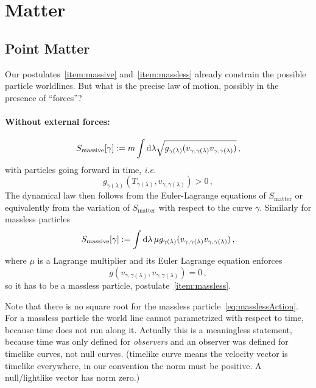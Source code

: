 \section{Matter}
\subsection{Point Matter}
Our postulates~\ref{item:massive} and~\ref{item:massless} already constrain the possible particle worldlines.
But what is the precise law of motion, possibly in the presence of ``forces''?

\paragraph{Without external forces:}
\begin{equation}
    S_\text{massive}[\gamma] := m\int\operatorname{d\!}\lambda\sqrt{g_{\gamma(\lambda)} ( v_{\gamma, \gamma(\lambda)} v_{\gamma, \gamma(\lambda)})}\,,
\end{equation}
with particles going forward in time, \textit{i.e.}
\begin{equation}
    g_{\gamma(\lambda)} \left( T_{\gamma(\lambda)}, v_{\gamma, \gamma(\lambda)} \right) > 0\,,
\end{equation}
The dynamical law then follows from the Euler-Lagrange equations of $S_\text{matter}$ or equivalently
from the variation of $S_\text{matter}$ with respect to the curve $\gamma$.
Similarly for massless particles
\begin{equation}
    S_\text{massive}[\gamma] := \int\operatorname{d\!}\lambda\, \mu g_{\gamma(\lambda)} ( v_{\gamma, \gamma(\lambda)} v_{\gamma, \gamma(\lambda)})\,,
    \label{eq:massiveAction}
\end{equation}
where $\mu$ is a Lagrange multiplier and its Euler Lagrange equation enforces
\begin{equation}
    g\left( v_{\gamma, \gamma(\lambda)}, v_{\gamma, \gamma(\lambda)} \right) = 0\,,
    \label{eq:masslessAction}
\end{equation}
so it has to be a massless particle, postulate~\ref{item:massless}.
\begin{note}
    Note that there is no square root for the massless particle~\ref{eq:masslessAction}.
    For a massless particle the world line cannot parametrized with respect to time,
    because time does not run along it.
    Actually this is a meaningless statement, because time was only defined for
    \textit{observers} and an observer was defined for timelike curves, not null curves.
    (timelike curve means the velocity vector is timelike everywhere, in our convention
    the norm must be positive. A null/lightlike vector has norm zero.)
\end{note}

